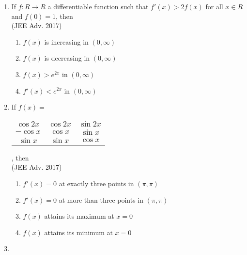 \documentclass[journal,12pt,twocolumn]{IEEEtran}
\theoremstyle{remark}
\begin{document}
\begin{enumerate}
{        }
    \item{
        
            If $f: R\rightarrow R$ a differentiable function such that $f'(x)>2f(x)$ for all $x \in R$ and $f(0) = 1$, then
            \\ \text{   } \hfill
                {(JEE Adv. 2017)}
            
            \begin{enumerate}
                \item $f(x)$ is increasing in $(0,\infty)$
                \item $f(x)$ is decreasing in $(0,\infty)$
                \item $f(x)>e^{2x}$ in $(0,\infty)$
                \item $f'(x)<e^{2x}$ in $(0,\infty)$
            \end{enumerate}
        
        }
    \item{
        
            If $f(x) = $
            \begin{tabular}{|c c c|} 
    
               $\cos 2x$& $\cos 2x$ & $\sin 2x$ \\ 
    
               $- \cos x$& $\cos x$ & $\sin x$\\ 
    
               $\sin x$ & $\sin x$ & $\cos x$\\ 
    
            \end{tabular} 
            , then
            \\ \text{   } \hfill
                {(JEE Adv. 2017)}
            
            \begin{enumerate}
                \item $f'(x) = 0$ at exactly three points in $(\pi,\pi)$
                \item $f'(x) = 0$ at more than three points in $(\pi,\pi)$
                \item $f(x)$ attains its maximum at $x=0$
                \item $f(x)$ attains its minimum at $x=0$
            \end{enumerate}
        
        }
    \item{
        
}
\end{enumerate}
\end{document}
